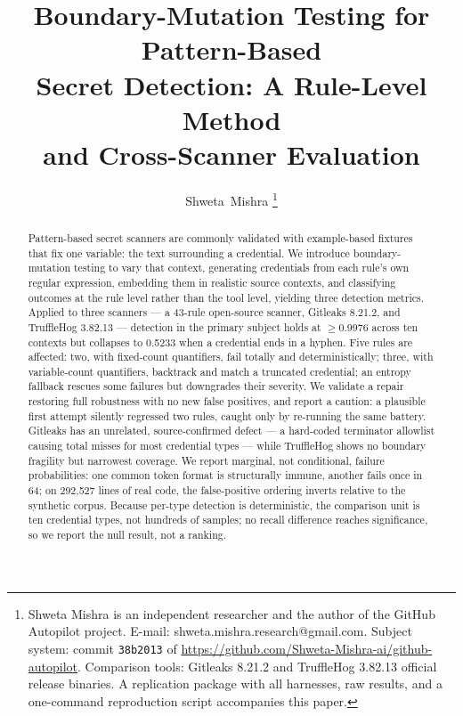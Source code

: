 \documentclass[journal]{IEEEtran}
\begin{document}
\title{Boundary-Mutation Testing for Pattern-Based\\
Secret Detection: A Rule-Level Method\\
and Cross-Scanner Evaluation}

\author{Shweta~Mishra
\thanks{Shweta Mishra is an independent researcher and the author of the GitHub Autopilot project. E-mail: shweta.mishra.research@gmail.com. Subject system: commit \texttt{38b2013} of \protect\url{https://github.com/Shweta-Mishra-ai/github-autopilot}. Comparison tools: Gitleaks 8.21.2 and TruffleHog 3.82.13 official release binaries. A replication package with all harnesses, raw results, and a one-command reproduction script accompanies this paper.}}


\maketitle

\begin{abstract}
Pattern-based secret scanners are commonly validated with example-based fixtures that fix one variable: the text surrounding a credential. We introduce boundary-mutation testing to vary that context, generating credentials from each rule's own regular expression, embedding them in realistic source contexts, and classifying outcomes at the rule level rather than the tool level, yielding three detection metrics. Applied to three scanners --- a 43-rule open-source scanner, Gitleaks 8.21.2, and TruffleHog 3.82.13 --- detection in the primary subject holds at $\geq$0.9976 across ten contexts but collapses to 0.5233 when a credential ends in a hyphen. Five rules are affected: two, with fixed-count quantifiers, fail totally and deterministically; three, with variable-count quantifiers, backtrack and match a truncated credential; an entropy fallback rescues some failures but downgrades their severity. We validate a repair restoring full robustness with no new false positives, and report a caution: a plausible first attempt silently regressed two rules, caught only by re-running the same battery. Gitleaks has an unrelated, source-confirmed defect --- a hard-coded terminator allowlist causing total misses for most credential types --- while TruffleHog shows no boundary fragility but narrowest coverage. We report marginal, not conditional, failure probabilities: one common token format is structurally immune, another fails once in 64; on 292{,}527 lines of real code, the false-positive ordering inverts relative to the synthetic corpus. Because per-type detection is deterministic, the comparison unit is ten credential types, not hundreds of samples; no recall difference reaches significance, so we report the null result, not a ranking.
\end{abstract}
\end{document}
